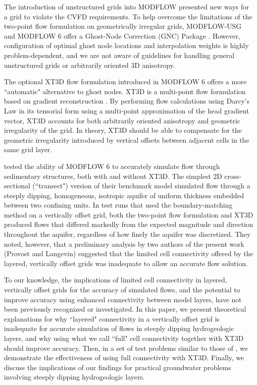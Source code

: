 \documentclass{article}
\begin{document}
The introduction of unstructured grids into MODFLOW \citep{modflowusg, modflow6gwf} presented new ways for a grid to violate the CVFD requirements. To help overcome the limitations of the two-point flow formulation on geometrically irregular grids, MODFLOW-USG and MODFLOW 6 offer a Ghost-Node Correction (GNC) Package \citep{modflowusg, modflow6gwf}. However, configuration of optimal ghost node locations and interpolation weights is highly problem-dependent, and we are not aware of guidelines for handling general unstructured grids or arbitrarily oriented 3D anisotropy.

The optional XT3D flow formulation \citep{modflow6xt3d} introduced in MODFLOW 6 offers a more ``automatic" alternative to ghost nodes. XT3D is a multi-point flow formulation \citep{edwards1998, aavatsmark2002} based on gradient reconstruction \citep{mavriplis2003leastsq, diskin2008accuracy}. By performing flow calculations using Darcy's Law in its tensorial form using a multi-point approximation of the head gradient vector, XT3D accounts for both arbitrarily oriented anisotropy and geometric irregularity of the grid. In theory, XT3D should be able to compensate for the geometric irregularity introduced by vertical offsets between adjacent cells in the same grid layer.

\cite{bardot2022} tested the ability of MODFLOW 6 to accurately simulate flow through sedimentary structures, both with and without XT3D. The simplest 2D cross-sectional (``transect") version of their benchmark model simulated flow through a steeply dipping, homogeneous, isotropic aquifer of uniform thickness embedded between two confining units. In test runs that used the boundary-matching method on a vertically offset grid, both the two-point flow formulation and XT3D produced flows that differed markedly from the expected magnitude and direction throughout the aquifer, regardless of how finely the aquifer was discretized. They noted, however, that a preliminary analysis by two authors of the present work (Provost and Langevin) suggested that the limited cell connectivity offered by the layered, vertically offset grids was inadequate to allow an accurate flow solution.

To our knowledge, the implications of limited cell connectivity in layered, vertically offset grids for the accuracy of simulated flows, and the potential to improve accuracy using enhanced connectivity between model layers, have not been previously recognized or investigated. In this paper, we present theoretical explanations for why ``layered" connectivity in a vertically offset grid is inadequate for accurate simulation of flows in steeply dipping hydrogeologic layers, and why using what we call ``full" cell connectivity together with XT3D should improve accuracy. Then, in a set of test problems similar to those of \cite{bardot2022}, we demonstrate the effectiveness of using full connectivity with XT3D. Finally, we discuss the implications of our findings for practical groundwater problems involving steeply dipping hydrogeologic layers.
\end{document}
